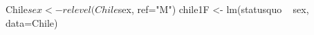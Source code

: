 \begin{Schunk}
\begin{Sinput}
 Chile$sex <- relevel(Chile$sex, ref="M")
 chile1F <- lm(statusquo ~ sex, data=Chile)
\end{Sinput}
\end{Schunk}
